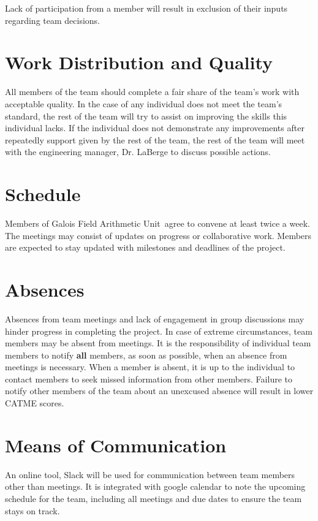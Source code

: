 \documentclass[paper=usletter, fontsize=12pt]{article}
\newcommand{\team}{Galois Field Arithmetic Unit}
\begin{document}
        Lack of participation from a member will result in exclusion of their inputs regarding team decisions. 

	\section{Work Distribution and Quality}
	All members of the team should complete a fair share of the team’s work with acceptable quality. In the case of any individual does not meet the team’s standard, the rest of the team will try to assist on improving the skills this individual lacks. If the individual does not demonstrate any improvements after repeatedly support given by the rest of the team, the rest of the team will meet with the engineering manager, Dr. LaBerge to discuss possible actions.     

    \section{Schedule}

        Members of \team \ agree to convene at least twice a week. The meetings may consist of updates on progress or collaborative work. Members are expected to stay updated with milestones and deadlines of the project.

    \section{Absences}

        Absences from team meetings and lack of engagement in group discussions may hinder progress in completing the project. In case of extreme circumstances, team members may be absent from meetings. It is the responsibility of individual team members to notify \textbf{all} members, as soon as possible, when an absence from meetings is necessary. When a member is absent, it is up to the individual to contact members to seek missed information from other members. Failure to notify other members of the team about an unexcused absence will result in lower CATME scores.

	\section{Means of Communication} 
	An online tool, Slack will be used for communication between team members other than meetings. It is integrated with google calendar to note the upcoming schedule for the team, including all meetings and due dates to ensure the team stays on track.  
\end{document}
